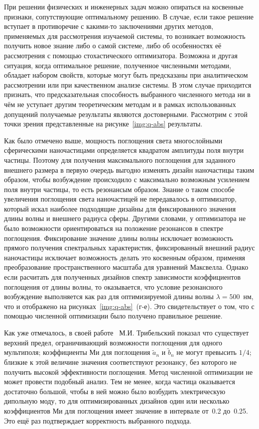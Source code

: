 При решении физических и инженерных задач можно опираться на косвенные
признаки, сопутствующие оптимальному решению.  В случае, если такое
решение вступает в противоречие с какими-то заключениями других
методов, применяемых для рассмотрения изучаемой системы, то возникает
возможность получить новое знание либо о самой системе, либо об
особенностях её рассмотрения с помощью стохастического
оптимизатора. Возможна и другая ситуация, когда оптимальное решение,
полученное численными методами, обладает набором свойств, которые
могут быть предсказаны при аналитическом рассмотрении или при
качественном анализе системы. В этом случае приходится признать, что
предсказательная способность выбранного численного метода ни в чём не
уступает другим теоретическим методам и в рамках использованных
допущений получаемые результаты являются достоверными. Рассмотрим с
этой точки зрения представленные на рисунке~\ref{img:q-abs}
результаты.

Как было отмечено выше, мощность поглощения света многослойными
сферическими наночастицами определяется квадратом амплитуды поля
внутри частицы.  Поэтому для получения максимального поглощения для
заданного внешнего размера в первую очередь выгодно изменять дизайн
наночастицы таким образом, чтобы возбуждение происходило с максимально
возможным усилением поля внутри частицы, то есть резонансым образом.
Знание о таком способе увеличения поглощения света наночастицей не
передавалось в оптимизатор, который искал наиболее подходящие дизайны
для фиксированного значения длины волны и внешнего радиуса сферы.
Другими словами, у оптимизатора не было возможности ориентироваться на
положение резонансов в спектре поглощения. Фиксирование значение длины
волны исключает возможность прямого получения спектральных
характеристик, фиксированный внешний радиус наночастицы исключает
возможность делать это косвенным образом, применяя преобразование
пространственного масштаба для уравнений Максвелла. Однако если
расчитать для полученных дизайнов спектр зависимости коэффициентов
поглощения от длины волны, то оказывается, что условие резонансного
возбуждение выполняется как раз для оптимизируемой длины волны
$\lambda=500$~нм, что и отображено на рисунках~\ref{img:q-abs}~(г-е).  Это
свидетельствует о том, что с помощью численной оптимизации было
получено правильное решение.

Как уже отмечалось, в своей работе~\cite{Tribelsky-2011}
М.И. Трибельский показал что существует верхний предел, ограничивающий
возможности поглощения для одного мультиполя; коэффициенты Ми для
поглощения $\tilde{a}_n$ и $\tilde{b}_n$ не могут превысить $1/4$;
близкие к этой величине значения соответствуют резонансу, без которого
не получить высокой эффективности поглощения.  Метод численной
оптимизации не может провести подобный анализ.  Тем не менее, когда
частица оказывается достаточно большой, чтобы в ней можно было
возбудить электрическую дипольную моду, то для оптимизированных
дизайнов один или несколько коэффициентов Ми для поглощения имеет
значение в интервале от~0.2 до~0.25.  Это ещё раз подтверждает
корректность выбранного подхода.


